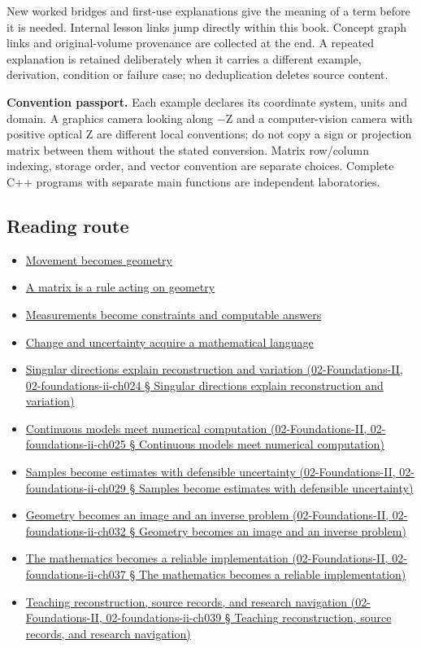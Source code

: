 New worked bridges and first-use explanations give the meaning of a term before it is needed. Internal lesson links jump directly within this book. Concept graph links and original-volume provenance are collected at the end. A repeated explanation is retained deliberately when it carries a different example, derivation, condition or failure case; no deduplication deletes source content.

\textbf{Convention passport.} Each example declares its coordinate system, units and domain. A graphics camera looking along −Z and a computer-vision camera with positive optical Z are different local conventions; do not copy a sign or projection matrix between them without the stated conversion. Matrix row/column indexing, storage order, and vector convention are separate choices. Complete C++ programs with separate main functions are independent laboratories.

\subsection{Reading route}\label{reading-route}

\begin{itemize}
\tightlist
\item
  \hyperref[01-foundations-i-ch017]{Movement becomes geometry}
\item
  \hyperref[01-foundations-i-ch018]{A matrix is a rule acting on geometry}
\item
  \hyperref[01-foundations-i-ch019]{Measurements become constraints and computable answers}
\item
  \hyperref[01-foundations-i-ch020]{Change and uncertainty acquire a mathematical language}
\item
  \href{}{Singular directions explain reconstruction and variation (02-Foundations-II, 02-foundations-ii-ch024 § Singular directions explain reconstruction and variation)}
\item
  \href{}{Continuous models meet numerical computation (02-Foundations-II, 02-foundations-ii-ch025 § Continuous models meet numerical computation)}
\item
  \href{}{Samples become estimates with defensible uncertainty (02-Foundations-II, 02-foundations-ii-ch029 § Samples become estimates with defensible uncertainty)}
\item
  \href{}{Geometry becomes an image and an inverse problem (02-Foundations-II, 02-foundations-ii-ch032 § Geometry becomes an image and an inverse problem)}
\item
  \href{}{The mathematics becomes a reliable implementation (02-Foundations-II, 02-foundations-ii-ch037 § The mathematics becomes a reliable implementation)}
\item
  \href{}{Teaching reconstruction, source records, and research navigation (02-Foundations-II, 02-foundations-ii-ch039 § Teaching reconstruction, source records, and research navigation)}
\end{itemize}

